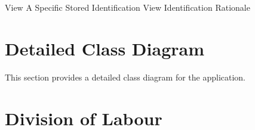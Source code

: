 \documentclass[]{article}
\begin{document}
\begin{center}
	\newpage
	View A Specific Stored Identification
	\newpage
	View Identification Rationale
\end{center}

\section{Detailed Class Diagram}
\label{sec:detailed_class_diagram}
This section provides a detailed class diagram for the application.

\appendix
\section{Division of Labour}
\label{sec:division_of_labour}
\end{document}
